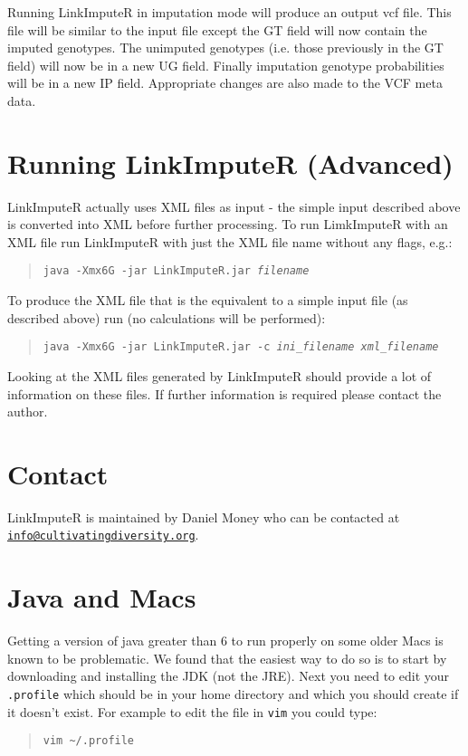 \documentclass[10pt]{report}
\begin{document}
Running LinkImputeR in imputation mode will produce an output vcf file.  This file will be similar to the input file except the GT field will now contain the imputed genotypes.  The unimputed genotypes (i.e. those previously in the GT field) will now be in a new UG field.  Finally imputation genotype probabilities will be in a new IP field.  Appropriate changes are also made to the VCF meta data.

\section{Running LinkImputeR (Advanced)}

LinkImputeR actually uses XML files as input - the simple input described above is converted into XML before further processing.  To run LimkImputeR with an XML file run LinkImputeR with just the XML file name without any flags, e.g.:

\begin{quote}
\texttt{java -Xmx6G -jar LinkImputeR.jar \textit{filename}}
\end{quote}

To produce the XML file that is the equivalent to a simple input file (as described above) run (no calculations will be performed):

\begin{quote}
\texttt{java -Xmx6G -jar LinkImputeR.jar -c \textit{ini\_filename} \textit{xml\_filename}}
\end{quote}

Looking at the XML files generated by LinkImputeR should provide a lot of information on these files.  If further information is required please contact the author.

\section{Contact}
LinkImputeR is maintained by Daniel Money who can be contacted at \\\texttt{\href{mailto:info@cultivatingdiversity.org}{info@cultivatingdiversity.org}}.

\clearpage
\section{Java and Macs}

Getting a version of java greater than 6 to run properly on some older Macs is known to be problematic.  We found that the easiest way to do so is to start by downloading and installing the JDK (not the JRE).  Next you need to edit your \texttt{.profile} which should be in your home directory and which you should create if it doesn't exist.  For example to edit the file in \texttt{vim} you could type:
\begin{quote}
\texttt{vim \textasciitilde/.profile}
\end{quote}
\end{document}
